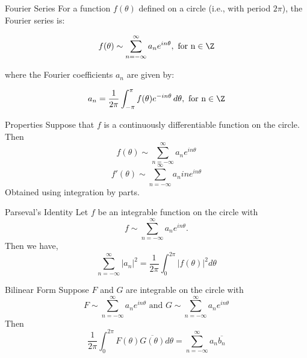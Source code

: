 \documentclass{beamer}
\begin{document}
\begin{frame}{Fourier Series}
For a function $f(\theta)$ defined on a circle (i.e., with period $2\pi$), the Fourier series is:

\begin{equation}
f(\theta) \sim \sum_{n=-\infty}^{\infty} a_n e^{in\theta}, \text{ for n}\in \Z
\end{equation}

where the Fourier coefficients $a_n$ are given by:

\begin{equation}
a_n = \frac{1}{2\pi} \int_{-\pi}^{\pi} f(\theta) e^{-in\theta} \, d\theta, \text{ for n}\in \Z
\end{equation}
\end{frame}

\begin{frame}{Properties}
    Suppose that $f$ is a continuously differentiable function on the circle. Then
    \begin{equation}
        f(\theta) \sim \sum_{n=-\infty}^{\infty} a_n e^{in\theta}
    \end{equation}
    \begin{equation}
        f'(\theta) \sim \sum_{n=-\infty}^{\infty} a_n ine^{in\theta}
    \end{equation}
    Obtained using integration by parts.
\end{frame} 

\begin{frame}{Parseval's Identity}
    Let $f$ be an integrable function on the circle with 
    \begin{equation}
        f \sim \sum_{n=-\infty}^{\infty} a_n e^{in\theta}.
    \end{equation}
    Then we have,
    \begin{equation}
        \sum_{n=-\infty}^{\infty} |a_n|^2 = \frac{1}{2\pi} \int_{0}^{2\pi} |f(\theta)|^2 d\theta
    \end{equation}
\end{frame}

\begin{frame}{Bilinear Form}
    Suppose $F$ and $G$ are integrable on the circle with 
    \begin{equation}
        F \sim \sum_{n=-\infty}^{\infty} a_n e^{in\theta} \text{ and } G \sim \sum_{n=-\infty}^{\infty} a_n e^{in\theta}
    \end{equation}
    Then
    \begin{equation}
        \frac{1}{2\pi} \int_{0}^{2\pi} F(\theta) \overline{G(\theta)} d\theta = \sum_{n=-\infty}^{\infty} a_n \overline{b_n}
    \end{equation}
\end{frame}
\end{document}

